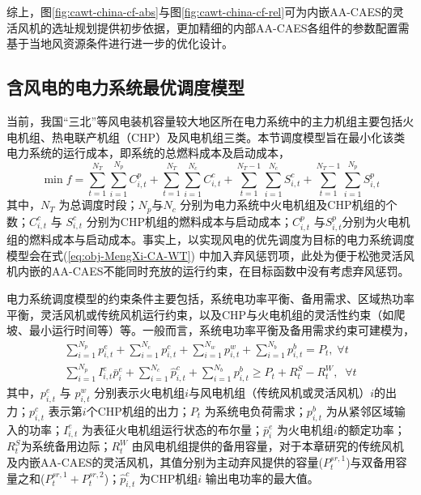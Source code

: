 综上，图\ref{fig:cawt-china-cf-abs}与图\ref{fig:cawt-china-cf-rel}可为内嵌AA-CAES的灵活风机的选址规划提供初步依据，更加精细的内部AA-CAES各组件的参数配置需基于当地风资源条件进行进一步的优化设计。


\subsection{含风电的电力系统最优调度模型}
\label{sec:ca-wt-power-energy-pene}
当前，我国“三北”等风电装机容量较大地区所在电力系统中的主力机组主要包括火电机组、热电联产机组（CHP）及风电机组三类。本节调度模型旨在最小化该类电力系统的运行成本，即系统的总燃料成本及启动成本，
\begin{equation}
\label{eq:obj-MengXi-CA-WT}
\min f = \sum\limits_{t = 1}^{{N_T}} {\sum\limits_{i = 1}^{{N_p}} {C_{i,t}^p} }  + \sum\limits_{t = 1}^{{N_T}} {\sum\limits_{i = 1}^{{N_c}} {C_{i,t}^c} }  + \sum\limits_{t = 1}^{{N_T} - 1} {\sum\limits_{i = 1}^{{N_c}} {S_{i,t}^c} }  + \sum\limits_{t = 1}^{{N_T} - 1} {\sum\limits_{i = 1}^{{N_p}} {S_{i,t}^p} }
\end{equation}
其中，${N_T}$ 为总调度时段；${N_p}$与${N_c}$ 分别为电力系统中火电机组及CHP机组的个数；$C_{i,t}^c$ 与 $S_{i,t}^c$ 分别为CHP机组的燃料成本与启动成本；$C_{i,t}^p$ 与$S_{i,t}^p$分别为火电机组的燃料成本与启动成本。事实上，以实现风电的优先调度为目标的电力系统调度模型会在式(\ref{eq:obj-MengXi-CA-WT}) 中加入弃风惩罚项，此处为便于松弛灵活风机内嵌的AA-CAES不能同时充放的运行约束，在目标函数中没有考虑弃风惩罚。

电力系统调度模型的约束条件主要包括，系统电功率平衡、备用需求、区域热功率平衡，灵活风机或传统风机运行约束，以及CHP与火电机组的灵活性约束（如爬坡、最小运行时间等）等。一般而言，系统电功率平衡及备用需求约束可建模为，
\begin{subequations}
\begin{gather}
\sum\limits_{i = 1}^{{N_p}} {p_{i,t}^e}  + \sum\limits_{i = 1}^{{N_c}} {p_{i,t}^c}  + \sum\limits_{i = 1}^{{N_w}} {p_{i,t}^w}  + \sum\limits_{i = 1}^{{N_b}} {p_{i,t}^b}  = {P_t}, \;\forall t\\
\sum\limits_{i = 1}^{{N_p}} {I_{i,t}^e\bar p_i^e}  + \sum\limits_{i = 1}^{{N_c}} {\hat p_{i,t}^c}  + \sum\limits_{i = 1}^{{N_b}} {p_{i,t}^b}  \ge {P_t} + R_t^S - R_t^W,\;\;\forall t
\end{gather}
\end{subequations}
其中，$p_{i,t}^e$ 与 $p_{i,t}^w$ 分别表示火电机组$i$与风电机组（传统风机或灵活风机）$i$的出力；$p_{i,t}^c$ 表示第$i$个CHP机组的出力；$P_t$ 为系统电负荷需求；$p_{i,t}^b$ 为从紧邻区域输入的功率；$I_{i,t}^e$ 为表征火电机组运行状态的布尔量；$\bar p_i^e$ 为火电机组$i$的额定功率；$R_t^S$为系统备用边际；$R_t^W$ 由风电机组提供的备用容量，对于本章研究的传统风机及内嵌AA-CAES的灵活风机，其值分别为主动弃风提供的容量($P_t^{sr,1}$)与双备用容量之和($P_t^{sr,1} + P_t^{sr,2}$)；$\hat p_{i,t}^c$ 为CHP机组$i$ 输出电功率的最大值。%

